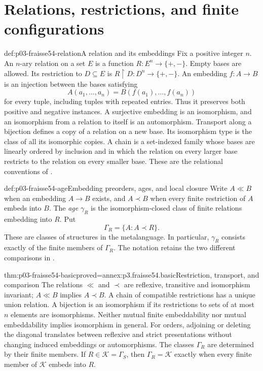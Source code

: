 \section{Relations, restrictions, and finite configurations}
\label{sec:p03-fraisse54-relations}

\begin{hbdefinition}{def:p03-fraisse54-relation}{A relation and its embeddings}
Fix a positive integer \(n\). An \(n\)-ary relation on a set \(E\) is a
function \(R:E^n\to\{+,-\}\). Empty bases are allowed. Its restriction to
\(D\subseteq E\) is \(R\mathbin{\upharpoonright}D:D^n\to\{+,-\}\).
An embedding \(f:A\to B\) is an injection between the bases satisfying
\[
 A(a_1,\ldots,a_n)=B(f(a_1),\ldots,f(a_n))
\]
for every tuple, including tuples with repeated entries. Thus it preserves
both positive and negative instances. A surjective embedding is an
isomorphism, and an isomorphism from a relation to itself is an automorphism.
Transport along a bijection defines a copy of a relation on a new base.
Its isomorphism type is the class of all its isomorphic copies.
A chain is a set-indexed family whose bases are linearly ordered
by inclusion and in which the relation on every larger base restricts to
the relation on every smaller base.
These are the relational conventions of \cite[\S1.2]{Fraisse1954}.
\end{hbdefinition}

\begin{hbdefinition}{def:p03-fraisse54-age}{Embedding preorders, ages, and local closure}
Write \(A\ll B\) when an embedding \(A\to B\) exists, and
\(A\prec B\) when every finite restriction of \(A\) embeds into \(B\).
The \emph{age} \(\gamma_R\) is the isomorphism-closed class of finite
relations embedding into \(R\). Put
\[
 \Gamma_R=\{A:A\prec R\}.
\]
These are classes of structures in the metalanguage. In particular,
\(\gamma_R\) consists exactly of the finite members of \(\Gamma_R\).
The notation retains the two different comparisons in
\cite[\S\S1.3--1.4]{Fraisse1954}.
\end{hbdefinition}

\begin{hblemma}{thm:p03-fraisse54-basic}{proved=annex:p3.fraisse54.basic}{Restriction, transport, and comparison}
The relations \(\ll\) and \(\prec\) are reflexive, transitive and
isomorphism invariant; \(A\ll B\) implies \(A\prec B\). A chain of
compatible restrictions has a unique union relation. A bijection is an
isomorphism if its restrictions to sets of at most \(n\) elements are
isomorphisms. Neither mutual finite embeddability nor mutual embeddability
implies isomorphism in general. For orders, adjoining or deleting the
diagonal translates between reflexive and strict presentations without
changing induced embeddings or automorphisms.
The classes \(\Gamma_R\) are determined by their finite members. If
\(R\in\mathcal K=\Gamma_S\), then \(\Gamma_R=\mathcal K\) exactly
when every finite member of \(\mathcal K\) embeds into \(R\).
\end{hblemma}

